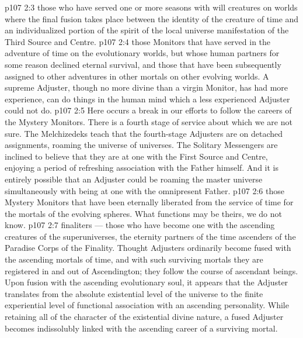 \vs p107 2:3 \bibnobreakspace {} those who have served one or more seasons with will creatures on worlds where the final fusion takes place between the identity of the creature of time and an individualized portion of the spirit of the local universe manifestation of the Third Source and Centre.
\vs p107 2:4 \bibnobreakspace {} those Monitors that have served in the adventure of time on the evolutionary worlds, but whose human partners for some reason declined eternal survival, and those that have been subsequently assigned to other adventures in other mortals on other evolving worlds. A supreme Adjuster, though no more divine than a virgin Monitor, has had more experience, can do things in the human mind which a less experienced Adjuster could not do.
\vs p107 2:5 \bibnobreakspace {} Here occurs a break in our efforts to follow the careers of the Mystery Monitors. There is a fourth stage of service about which we are not sure. The Melchizedeks teach that the fourth\hyp{}stage Adjusters are on detached assignments, roaming the universe of universes. The Solitary Messengers are inclined to believe that they are at one with the First Source and Centre, enjoying a period of refreshing association with the Father himself. And it is entirely possible that an Adjuster could be roaming the master universe simultaneously with being at one with the omnipresent Father.
\vs p107 2:6 \bibnobreakspace {} those Mystery Monitors that have been eternally liberated from the service of time for the mortals of the evolving spheres. What functions may be theirs, we do not know.
\vs p107 2:7 \bibnobreakspace {} finaliters --- those who have become one with the ascending creatures of the superuniverses, the eternity partners of the time ascenders of the Paradise Corps of the Finality. Thought Adjusters ordinarily become fused with the ascending mortals of time, and with such surviving mortals they are registered in and out of Ascendington; they follow the course of ascendant beings. Upon fusion with the ascending evolutionary soul, it appears that the Adjuster translates from the absolute existential level of the universe to the finite experiential level of functional association with an ascending personality. While retaining all of the character of the existential divine nature, a fused Adjuster becomes indissolubly linked with the ascending career of a surviving mortal.
